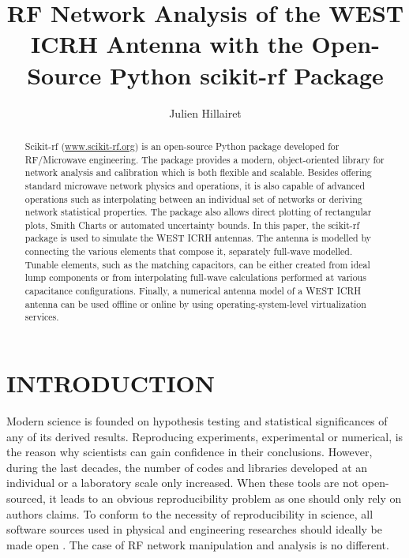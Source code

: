 \documentclass{aip-cp}
\begin{document}
\title{RF Network Analysis of the WEST ICRH Antenna with the Open-Source Python 
	scikit-rf Package}

\author[IRFM]{Julien Hillairet}



\maketitle


\begin{abstract}
Scikit-rf (\url{www.scikit-rf.org}) is an open-source Python package developed for RF/Microwave engineering. The package provides a modern, object-oriented library for network analysis and calibration which is both flexible and scalable. Besides offering standard microwave network physics and operations, it is also capable of advanced operations such as interpolating between an individual set of networks or deriving network statistical properties. The package also allows direct plotting of rectangular plots, Smith Charts or automated uncertainty bounds. In this paper, the scikit-rf package is used to simulate the WEST ICRH antennas. The antenna is modelled by connecting the various elements that compose it, separately full-wave modelled. Tunable elements, such as the matching capacitors, can be either created from ideal lump components or from interpolating full-wave calculations performed at various capacitance configurations. Finally, a numerical antenna model of a WEST ICRH antenna can be used offline or online by using operating-system-level virtualization services. 
\end{abstract}


\section{INTRODUCTION}
Modern science is founded on hypothesis testing and statistical significances of any of its derived results. Reproducing experiments, experimental or numerical, is the reason why scientists can gain confidence in their conclusions. However, during the last decades, the number of codes and libraries developed at an individual or a laboratory scale only increased. When these tools are not open-sourced, it leads to an obvious reproducibility problem as one should only rely on authors claims. To conform to the necessity of reproducibility in science, all software sources used in physical and engineering researches should ideally be made open \cite{Ince2012}. The case of RF network manipulation and analysis is no different. 
\end{document}
